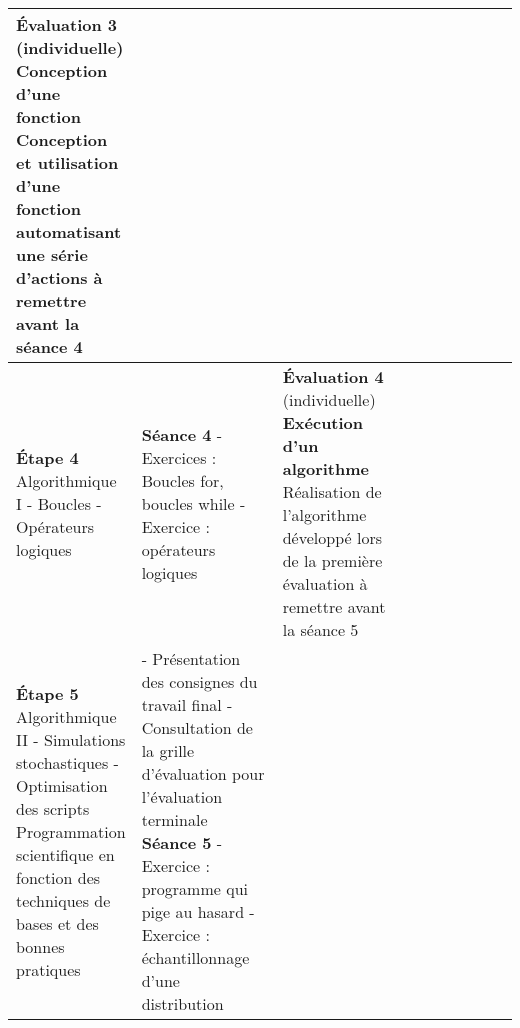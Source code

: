 \documentclass[12]{article}
\begin{document}
\begin{center}
\begin{tabular}{| p{0.1\linewidth} | p{0.3\linewidth} | p{0.3\linewidth} | p{0.3\linewidth} | }
        \textbf{Évaluation 3} (individuelle) \linebreak
        \textbf{Conception d'une fonction}\hfill\hfill \linebreak
        Conception et utilisation d'une fonction automatisant une série d'actions à remettre avant la séance 4\hfill\hfill \\
        \hline
        \textbf{Étape 4}
        Algorithmique I\hfill\hfill \linebreak\linebreak 
            - Boucles\hfill\hfill \linebreak
            - Opérateurs logiques\hfill\hfill &
        \textbf{Séance 4} \linebreak
        - Exercices : Boucles for, boucles while\hfill\hfill \linebreak
        - Exercice : opérateurs logiques\hfill\hfill & 
        \textbf{Évaluation 4} (individuelle) \linebreak
        \textbf{Exécution d'un algorithme}\hfill\hfill \linebreak
        Réalisation de l'algorithme développé lors de la première évaluation à remettre avant la séance 5\hfill\hfill \\
        \hline
        \textbf{Étape 5}
        Algorithmique II\hfill\hfill \linebreak\linebreak 
            - Simulations stochastiques\hfill\hfill \linebreak
            - Optimisation des scripts\hfill\hfill \linebreak\linebreak
        Programmation scientifique en fonction des techniques de bases et des bonnes pratiques &
        - Présentation des consignes du travail final \hfill\hfill \linebreak
        - Consultation de la grille d'évaluation pour l'évaluation terminale\hfill\hfill \linebreak
        \textbf{Séance 5} \linebreak
        - Exercice : programme qui pige au hasard\hfill\hfill \linebreak
        - Exercice : échantillonnage d'une distribution\hfill\hfill \linebreak

\end{tabular}
\end{center}
\end{document}
